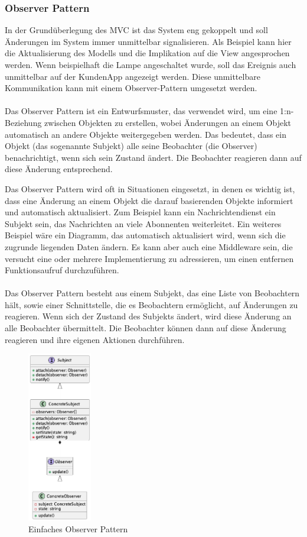 \subsubsection{Observer Pattern}
In der Grundüberlegung des MVC ist das System eng gekoppelt und soll Änderungen im System immer unmittelbar signalisieren. Als Beispiel kann hier die Aktualisierung des Modells und die Implikation auf die View angesprochen werden. 
Wenn beispielhaft die Lampe angeschaltet wurde, soll das Ereignis auch unmittelbar auf der KundenApp angezeigt werden. 
Diese unmittelbare Kommunikation kann mit einem Observer-Pattern umgesetzt werden. 
\\\\
Das Observer Pattern ist ein Entwurfsmuster, das verwendet wird, um eine 1:n-Beziehung zwischen Objekten zu erstellen, wobei Änderungen an einem Objekt automatisch an andere Objekte weitergegeben werden. Das bedeutet, dass ein Objekt (das sogenannte Subjekt) alle seine Beobachter (die Observer) benachrichtigt, wenn sich sein Zustand ändert. Die Beobachter reagieren dann auf diese Änderung entsprechend.

Das Observer Pattern wird oft in Situationen eingesetzt, in denen es wichtig ist, dass eine Änderung an einem Objekt die darauf basierenden Objekte informiert und automatisch aktualisiert. Zum Beispiel kann ein Nachrichtendienst ein Subjekt sein, das Nachrichten an viele Abonnenten weiterleitet. Ein weiteres Beispiel wäre ein Diagramm, das automatisch aktualisiert wird, wenn sich die zugrunde liegenden Daten ändern. Es kann aber auch eine Middleware sein, die versucht eine oder mehrere Implementierung zu adressieren, um einen entfernen Funktionsaufruf durchzuführen. 
\\\\
Das Observer Pattern besteht aus einem Subjekt, das eine Liste von Beobachtern hält, sowie einer Schnittstelle, die es Beobachtern ermöglicht, auf Änderungen zu reagieren. Wenn sich der Zustand des Subjekts ändert, wird diese Änderung an alle Beobachter übermittelt. Die Beobachter können dann auf diese Änderung reagieren und ihre eigenen Aktionen durchführen.
\begin{figure}[ht]
  \centering
  \includegraphics[width=0.25\textwidth]{fig/uml/default-observer.png}
  \caption{Einfaches Observer Pattern}
  \label{fig:default-observer}
\end{figure}

